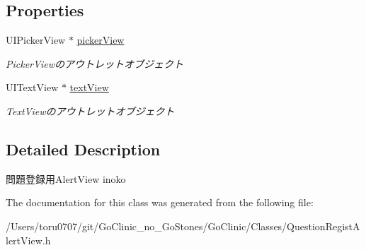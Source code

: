 \subsection*{Properties}
\begin{DoxyCompactItemize}
\item 
\hypertarget{interface_question_regist_alert_view_a7a6b1d14ec4d4b0fb2f90f9540bbdfda}{
UIPickerView $\ast$ \hyperlink{interface_question_regist_alert_view_a7a6b1d14ec4d4b0fb2f90f9540bbdfda}{pickerView}}
\label{interface_question_regist_alert_view_a7a6b1d14ec4d4b0fb2f90f9540bbdfda}

\begin{DoxyCompactList}\small\item\em PickerViewのアウトレットオブジェクト \end{DoxyCompactList}\item 
\hypertarget{interface_question_regist_alert_view_ae44891cfd7df3d2b8048b71a1554cb6e}{
UITextView $\ast$ \hyperlink{interface_question_regist_alert_view_ae44891cfd7df3d2b8048b71a1554cb6e}{textView}}
\label{interface_question_regist_alert_view_ae44891cfd7df3d2b8048b71a1554cb6e}

\begin{DoxyCompactList}\small\item\em TextViewのアウトレットオブジェクト \end{DoxyCompactList}\end{DoxyCompactItemize}


\subsection{Detailed Description}
問題登録用AlertView  inoko 

The documentation for this class was generated from the following file:\begin{DoxyCompactItemize}
\item 
/Users/toru0707/git/GoClinic\_\-no\_\-GoStones/GoClinic/Classes/QuestionRegistAlertView.h\end{DoxyCompactItemize}

